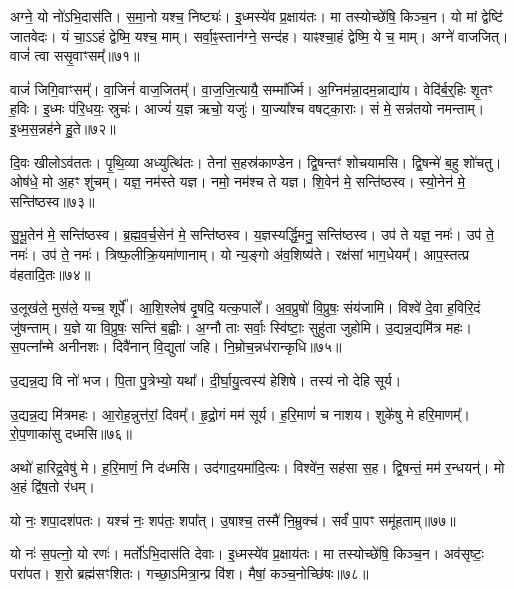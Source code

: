 अग्ने॒ यो नो॑\-ऽभि॒दास॑ति।
स॒मा॒नो यश्च॒ निष्ट्यः॑।
इ॒ध्मस्ये॑व प्र॒क्षाय॑तः।
मा तस्योच्छे॑षि॒ किञ्च॒न।
यो मां द्वेष्टि॑ जातवेदः।
यं चा॒ऽऽहं द्वेष्मि॒ यश्च॒ माम्।
सर्वा॒ꣴ॒स्तान॑ग्ने॒ सन्द॑ह।
याꣴश्चा॒हं द्वेष्मि॒ ये च॒ माम्।
अग्ने॑ वाजजित्।
वाजं॑ त्वा ससृ॒वाꣳसम्᳚॥७१॥\ip

वाजं॑ जिगि॒वाꣳसम्᳚।
वा॒जिनं॑ वाज॒जितम्᳚।
वा॒ज॒जि॒त्यायै॒ सम्मा᳚र्ज्मि।
अ॒ग्निम॑न्ना॒दम॒न्नाद्या॑य।
वेदि॑र्ब॒र्॒हिः शृ॒तꣳ ह॒विः।
इ॒ध्मः प॑रि॒धयः॒ स्रुचः॑।
आज्यं॑ य॒ज्ञ ऋचो॒ यजुः॑।
या॒ज्या᳚श्च वषट्का॒राः।
सं मे॒ सन्न॑तयो नमन्ताम्।
इ॒ध्म॒स॒न्नह॑ने हु॒ते॥७२॥\ip

दि॒वः खीलो\-ऽव॑ततः।
पृ॒थि॒व्या अध्युत्थि॑तः।
तेना॑ स॒हस्र॑काण्डेन।
द्वि॒षन्तꣳ॑ शोचयामसि।
द्वि॒षन्मे॑ ब॒हु शो॑चतु।
ओष॑धे॒ मो अ॒हꣳ शु॑चम्।
यज्ञ॒ नम॑स्ते यज्ञ।
नमो॒ नम॑श्च ते यज्ञ।
शि॒वेन॑ मे॒ सन्ति॑ष्ठस्व।
स्यो॒नेन॑ मे॒ सन्ति॑ष्ठस्व॥७३॥\ip

सु॒भू॒तेन॑ मे॒ सन्ति॑ष्ठस्व।
ब्र॒ह्म॒व॒र्च॒सेन॑ मे॒ सन्ति॑ष्ठस्व।
य॒ज्ञस्यर्द्धि॒मनु॒ सन्ति॑ष्ठस्व।
उप॑ ते यज्ञ॒ नमः॑।
उप॑ ते॒ नमः॑।
उप॑ ते॒ नमः॑।
त्रिष्फ॒लीक्रि॒यमा॑णानाम्।
यो न्य॒ङ्गो अ॑व॒शिष्य॑ते।
रक्ष॑सां भाग॒धेयम्᳚।
आप॒स्तत्प्र व॑हतादि॒तः॥७४॥\ip

उ॒लूख॑ले॒ मुस॑ले॒ यच्च॒ शूर्पे᳚।
आ॒शि॒श्लेष॑ दृ॒षदि॒ यत्क॒पाले᳚।
अ॒व॒प्रुषो॑ वि॒प्रुषः॒ संय॑जामि।
विश्वे॑ दे॒वा ह॒विरि॒दं जु॑षन्ताम्।
य॒ज्ञे या वि॒प्रुषः॒ सन्ति॑ ब॒ह्वीः।
अ॒ग्नौ ताः सर्वाः॒ स्वि॑ष्टाः॒ सुहु॑ता जुहोमि।
उ॒द्यन्न॒द्यमि॑त्र महः।
स॒पत्ना᳚न्मे अनीनशः।
दिवै॑नान् वि॒द्युता॑ जहि।
नि॒म्रोच॒न्नध॑रान्कृधि॥७५॥\ip

उ॒द्यन्न॒द्य वि नो॑ भज।
पि॒ता पु॒त्रेभ्यो॒ यथा᳚।
दी॒र्घा॒यु॒त्वस्य॑ हेशिषे।
तस्य॑ नो देहि सूर्य।


उ॒द्यन्न॒द्य मि॑त्रमहः।
आ॒रोह॒न्नुत्त॑रां॒ दिवम्᳚।
हृ॒द्रो॒गं मम॑ सूर्य।
ह॒रि॒माणं॑ च नाशय।
शुके॑षु मे हरि॒माणम्᳚।
रो॒प॒णाका॑सु दध्मसि॥७६॥\ip

अथो॑ हारिद्र॒वेषु॑ मे।
ह॒रि॒माणं॒ नि द॑ध्मसि।
उद॑गाद॒यमा॑दि॒त्यः।
विश्वे॑न॒ सह॑सा स॒ह।
द्वि॒षन्तं॒ मम॑ र॒न्धयन्॑।
मो अ॒हं द्वि॑ष॒तो र॑धम्।

{\small \closesub{}}

यो नः॒ शपा॒दश॑पतः।
यश्च॑ नः॒ शप॑तः॒ शपा᳚त्।
उ॒षाश्च॒ तस्मै॑ नि॒म्रुक्च॑।
सर्वं॑ पा॒पꣳ समू॑हताम्॥७७॥\ip

यो नः॑ स॒पत्नो॒ यो रणः॑।
मर्तो॑\-ऽभि॒दास॑ति देवाः।
इ॒ध्मस्ये॑व प्र॒क्षाय॑तः।
मा तस्योच्छे॑षि॒ किञ्च॒न।
अव॑सृष्टः॒ परा॑पत।
श॒रो ब्रह्म॑सꣳशितः।
गच्छा॒\-ऽमित्रा॒न्प्र वि॑श।
मैषां॒ कञ्च॒नोच्छि॑षः॥७८॥\ip{}

